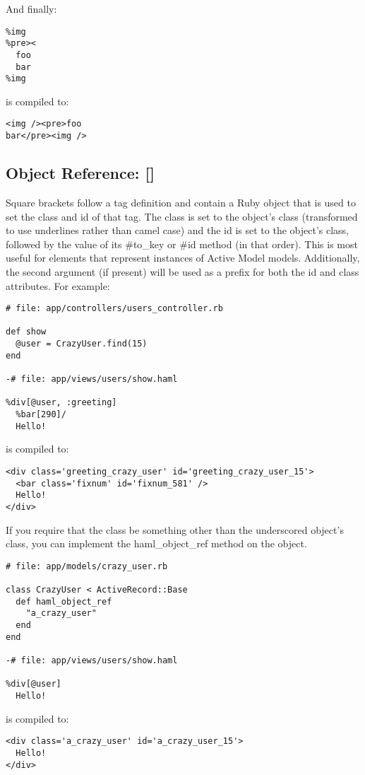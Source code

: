\documentclass[9pt]{article}
\begin{document}
 And finally:
\begin{verbatim}
%img
%pre><
  foo
  bar
%img
\end{verbatim}


 is compiled to:
\begin{verbatim}
<img /><pre>foo
bar</pre><img />
\end{verbatim}
\subsection{Object Reference: []}


 Square brackets follow a tag definition and contain a Ruby object that is used to set the class and id of that tag. The class is set to the object’s class (transformed to use underlines rather than camel case) and the id is set to the object’s class, followed by the value of its \#to\_key or \#id method (in that order). This is most useful for elements that represent instances of Active Model models. Additionally, the second argument (if present) will be used as a prefix for both the id and class attributes. For example:
\begin{verbatim}
# file: app/controllers/users_controller.rb

def show
  @user = CrazyUser.find(15)
end

-# file: app/views/users/show.haml

%div[@user, :greeting]
  %bar[290]/
  Hello!
\end{verbatim}


 is compiled to:
\begin{verbatim}
<div class='greeting_crazy_user' id='greeting_crazy_user_15'>
  <bar class='fixnum' id='fixnum_581' />
  Hello!
</div>
\end{verbatim}


 If you require that the class be something other than the underscored object’s class, you can implement the haml\_object\_ref method on the object.
\begin{verbatim}
# file: app/models/crazy_user.rb

class CrazyUser < ActiveRecord::Base
  def haml_object_ref
    "a_crazy_user"
  end
end

-# file: app/views/users/show.haml

%div[@user]
  Hello!
\end{verbatim}


 is compiled to:
\begin{verbatim}
<div class='a_crazy_user' id='a_crazy_user_15'>
  Hello!
</div>
\end{verbatim}
\end{document}
